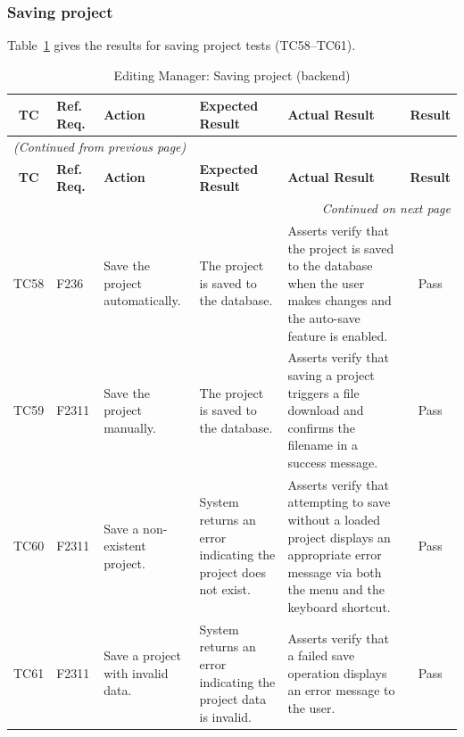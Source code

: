 \documentclass[12pt, titlepage]{article}
\begin{document}
\subsubsection{Saving project}
Table~\ref{table:em_save_tests} gives the results for saving project tests (TC58--TC61).

\begin{longtable}{c
    >{\raggedright\arraybackslash}p{1.5cm}
    >{\raggedright\arraybackslash}p{3cm}
    >{\raggedright\arraybackslash}p{3cm}
  >{\raggedright\arraybackslash}p{4.5cm} c}
  \caption{Editing Manager: Saving project (backend)}
  \label{table:em_save_tests} \\
  \toprule
  \textbf{TC} & \textbf{Ref. Req.} & \textbf{Action} &
  \textbf{Expected Result} & \textbf{Actual Result} & \textbf{Result} \\
  \midrule
  \endfirsthead

  \multicolumn{6}{l}{\textit{(Continued from previous page)}} \\
  \toprule
  \textbf{TC} & \textbf{Ref. Req.} & \textbf{Action} &
  \textbf{Expected Result} & \textbf{Actual Result} & \textbf{Result} \\
  \midrule
  \endhead

  \multicolumn{6}{r}{\textit{Continued on next page}} \\
  \endfoot

  \bottomrule
  \endlastfoot

  TC58 & F236 & Save the project automatically. & The project is saved to the database. & Asserts verify that the project is saved to the database when the user makes changes and the auto-save feature is enabled. & \cellcolor{green} Pass \\ \midrule
  TC59 & F2311 & Save the project manually. & The project is saved to the database. & Asserts verify that saving a project triggers a file download and confirms the filename in a success message. & \cellcolor{green} Pass \\ \midrule
  TC60 & F2311 & Save a non-existent project. & System returns an error indicating the project does not exist. & Asserts verify that attempting to save without a loaded project displays an appropriate error message via both the menu and the keyboard shortcut. & \cellcolor{green} Pass \\ \midrule
  TC61 & F2311 & Save a project with invalid data. & System returns an error indicating the project data is invalid. & Asserts verify that a failed save operation displays an error message to the user. & \cellcolor{green} Pass \\
\end{longtable}
\end{document}
